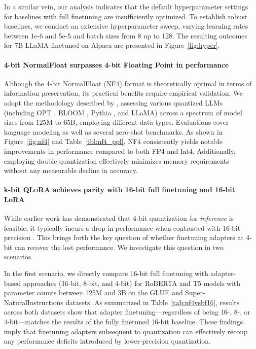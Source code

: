 In a similar vein, our analysis indicates that the default hyperparameter settings for baselines with full finetuning are insufficiently optimized. To establish robust baselines, we conduct an extensive hyperparameter sweep, varying learning rates between 1e-6 and 5e-5 and batch sizes from 8 up to 128. The resulting outcomes for 7B LLaMA finetuned on Alpaca are presented in Figure~\ref{fig:hyper}.

\paragraph{4-bit NormalFloat surpasses 4-bit Floating Point in performance}

Although the 4-bit NormalFloat (NF4) format is theoretically optimal in terms of information preservation, its practical benefits require empirical validation. We adopt the methodology described by \citet{dettmers2022case}, assessing various quantized LLMs (including OPT \citep{zhang2022opt}, BLOOM \cite{scao2022bloom}, Pythia \cite{biderman2023pythia}, and LLaMA) across a spectrum of model sizes from 125M to 65B, employing different data types. Evaluations cover language modeling as well as several zero-shot benchmarks. As shown in Figure~\ref{fig:nf4} and Table~\ref{tbl:nf4_ppl}, NF4 consistently yields notable improvements in performance compared to both FP4 and Int4. Additionally, employing double quantization effectively minimizes memory requirements without any measurable decline in accuracy.

\paragraph{k-bit \textsc{QLoRA} achieves parity with 16-bit full finetuning and 16-bit LoRA} While earlier work has demonstrated that 4-bit quantization for \emph{inference} is feasible, it typically incurs a drop in performance when contrasted with 16-bit precision \citep{dettmers2022case,frantar2022gptq}. This brings forth the key question of whether finetuning adapters at 4-bit can recover the lost performance. We investigate this question in two scenarios.

In the first scenario, we directly compare 16-bit full finetuning with adapter-based approaches (16-bit, 8-bit, and 4-bit) for RoBERTA and T5 models with parameter counts between 125M and 3B on the GLUE and Super-NaturalInstructions datasets. As summarized in Table~\ref{tab:nf4vsbf16}, results across both datasets show that adapter finetuning—regardless of being 16-, 8-, or 4-bit—matches the results of the fully finetuned 16-bit baseline. These findings imply that finetuning adapters subsequent to quantization can effectively recoup any performance deficits introduced by lower-precision quantization.

